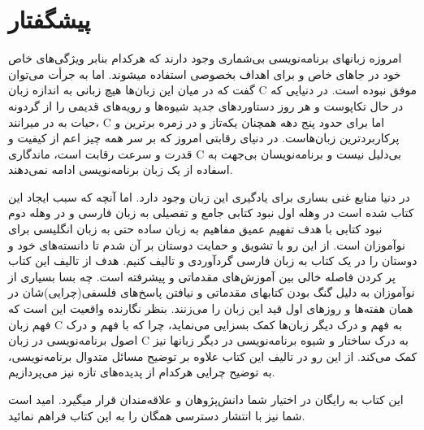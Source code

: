 \chapter*{پیشگفتار}
امروزه زبانهای برنامه‌نویسی بی‌شماری وجود دارند که هرکدام بنابر ویژگی‌های خاص خود در جاهای خاص و برای اهداف بخصوصی استفاده میشوند. اما به جرأت می‌توان گفت که در میان این زبان‌ها هیچ زبانی به اندازه زبان C موفق نبوده است. در دنیایی که در حال تکاپوست و هر روز دستاوردهای جدید شیوه‌ها و رویه‌های قدیمی را از گردونه حیات به در میرانند، C اما برای حدود پنج دهه همچنان یکه‌تاز و در زمره برترین و پرکاربردترین زبان‌هاست. در دنیای رقابتی امروز که بر سر همه چیز اعم از کیفیت و قدرت و سرعت رقابت است، ماندگاری C بی‌دلیل نیست و برنامه‌نویسان بی‌جهت به اسفاده از یک زبان برنامه‌نویسی ادامه نمی‌دهند.

در دنیا منابع غنی بساری برای یادگیری این زبان وجود دارد. اما آنچه که سبب ایجاد این کتاب شده است در وهله اول نبود کتابی جامع و تفصیلی به زبان فارسی و در وهله دوم نبود کتابی با هدف تفهیم عمیق مفاهیم به زبان ساده حتی به زبان انگلیسی برای نوآموزان است. از این رو با تشویق و حمایت دوستان بر آن شدم تا دانسته‌های خود و دوستان را در یک کتاب به زبان فارسی گردآوردی و تالیف کنیم. هدف از تالیف این کتاب پر کردن فاصله خالی بین آموزش‌های مقدماتی و پیشرفته است. چه بسا بسیاری از نوآموزان به دلیل گنگ بودن کتابهای مقدماتی و نیافتن پاسخ‌های فلسفی(چرایی)شان در همان هفته‌ها و روزهای اول قید این زبان را می‌زنند. بنظر نگارنده واقعیت این است که فهم زبان C به فهم و درک دیگر زبان‌ها کمک بسزایی می‌نماید، چرا که با فهم و درک اصول برنامه‌نویسی در زبان C به درک ساختار و شیوه برنامه‌نویسی در دیگر زبانها نیز کمک می‌کند. از این رو در تالیف این کتاب علاوه بر توضیح مسائل متدوال برنامه‌نویسی، به توضیح چرایی هرکدام از پدیده‌های تازه نیز می‌پردازیم. 

این کتاب به رایگان در اختیار شما دانش‌پژوهان و علاقه‌مندان قرار میگیرد. امید است شما نیز با انتشار دسترسی همگان را به این کتاب فراهم نمائید.

